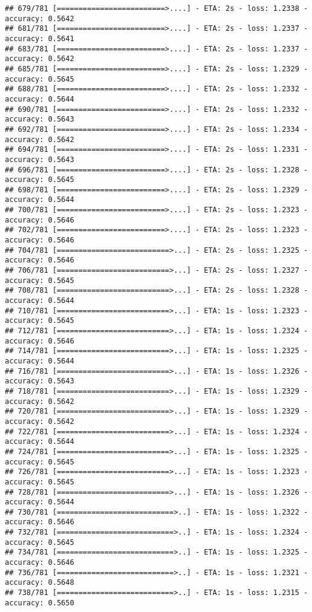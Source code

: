 \documentclass[
]{article}
\begin{document}
\begin{verbatim}
## 679/781 [=========================>....] - ETA: 2s - loss: 1.2338 - accuracy: 0.5642
## 681/781 [=========================>....] - ETA: 2s - loss: 1.2337 - accuracy: 0.5641
## 683/781 [=========================>....] - ETA: 2s - loss: 1.2337 - accuracy: 0.5642
## 685/781 [=========================>....] - ETA: 2s - loss: 1.2329 - accuracy: 0.5645
## 688/781 [=========================>....] - ETA: 2s - loss: 1.2332 - accuracy: 0.5644
## 690/781 [=========================>....] - ETA: 2s - loss: 1.2332 - accuracy: 0.5643
## 692/781 [=========================>....] - ETA: 2s - loss: 1.2334 - accuracy: 0.5642
## 694/781 [=========================>....] - ETA: 2s - loss: 1.2331 - accuracy: 0.5643
## 696/781 [=========================>....] - ETA: 2s - loss: 1.2328 - accuracy: 0.5645
## 698/781 [=========================>....] - ETA: 2s - loss: 1.2329 - accuracy: 0.5644
## 700/781 [=========================>....] - ETA: 2s - loss: 1.2323 - accuracy: 0.5646
## 702/781 [=========================>....] - ETA: 2s - loss: 1.2323 - accuracy: 0.5646
## 704/781 [==========================>...] - ETA: 2s - loss: 1.2325 - accuracy: 0.5646
## 706/781 [==========================>...] - ETA: 2s - loss: 1.2327 - accuracy: 0.5645
## 708/781 [==========================>...] - ETA: 2s - loss: 1.2328 - accuracy: 0.5644
## 710/781 [==========================>...] - ETA: 1s - loss: 1.2323 - accuracy: 0.5645
## 712/781 [==========================>...] - ETA: 1s - loss: 1.2324 - accuracy: 0.5646
## 714/781 [==========================>...] - ETA: 1s - loss: 1.2325 - accuracy: 0.5644
## 716/781 [==========================>...] - ETA: 1s - loss: 1.2326 - accuracy: 0.5643
## 718/781 [==========================>...] - ETA: 1s - loss: 1.2329 - accuracy: 0.5642
## 720/781 [==========================>...] - ETA: 1s - loss: 1.2329 - accuracy: 0.5642
## 722/781 [==========================>...] - ETA: 1s - loss: 1.2324 - accuracy: 0.5644
## 724/781 [==========================>...] - ETA: 1s - loss: 1.2325 - accuracy: 0.5645
## 726/781 [==========================>...] - ETA: 1s - loss: 1.2323 - accuracy: 0.5645
## 728/781 [==========================>...] - ETA: 1s - loss: 1.2326 - accuracy: 0.5644
## 730/781 [===========================>..] - ETA: 1s - loss: 1.2322 - accuracy: 0.5646
## 732/781 [===========================>..] - ETA: 1s - loss: 1.2324 - accuracy: 0.5645
## 734/781 [===========================>..] - ETA: 1s - loss: 1.2325 - accuracy: 0.5646
## 736/781 [===========================>..] - ETA: 1s - loss: 1.2321 - accuracy: 0.5648
## 738/781 [===========================>..] - ETA: 1s - loss: 1.2315 - accuracy: 0.5650

\end{verbatim}
\end{document}
